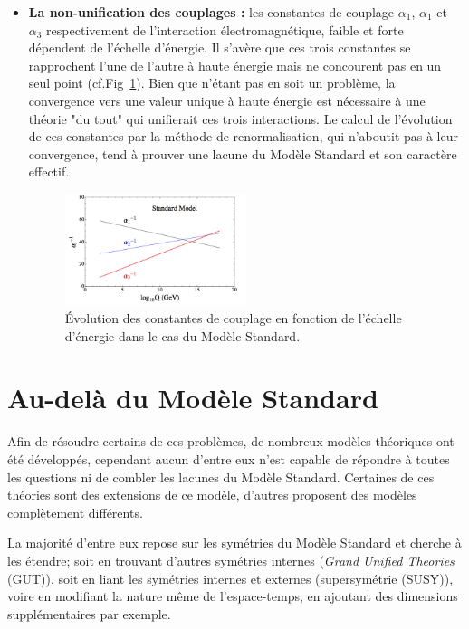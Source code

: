 \begin{itemize}[label=$\bullet$]
\item \textbf{La non-unification des couplages : }les constantes de couplage $\alpha_{1}$, $\alpha_{1}$ et $\alpha_{3}$ respectivement de l'interaction électromagnétique, faible et forte dépendent de l'échelle d'énergie. Il s'avère que ces trois constantes se rapprochent l'une de l'autre à haute énergie mais ne concourent pas en un seul point (cf.Fig~\ref{constantes}). Bien que n'étant pas en soit un problème, la convergence vers une valeur unique à haute énergie est nécessaire à une théorie "du tout" qui unifierait ces trois interactions. Le calcul de l'évolution de ces constantes par la méthode de renormalisation, qui n'aboutit pas à leur convergence, tend à prouver une lacune du Modèle Standard et son caractère effectif.
\begin{figure}[ht!]
\centering
\includegraphics[width=0.50\textwidth]{SM/couplageSM.jpg}
\captionsetup{type=figure}\caption{Évolution des constantes de couplage en fonction de l'échelle d'énergie dans le cas du Modèle Standard.}
\label{constantes}
\end{figure}
\end{itemize}

\section{Au-delà du Modèle Standard}
Afin de résoudre certains de ces problèmes, de nombreux modèles théoriques ont été développés, cependant aucun d'entre eux n'est capable de répondre à toutes les questions ni de combler les lacunes du Modèle Standard. Certaines de ces théories sont des extensions de ce modèle, d'autres proposent des modèles complètement différents.

La majorité d'entre eux repose sur les symétries du Modèle Standard et cherche à les étendre; soit en trouvant d'autres symétries internes (\textit{Grand Unified Theories} (GUT)), soit en liant les symétries internes et externes (supersymétrie (SUSY)), voire en modifiant la nature même de l'espace-temps, en ajoutant des dimensions supplémentaires par exemple.

